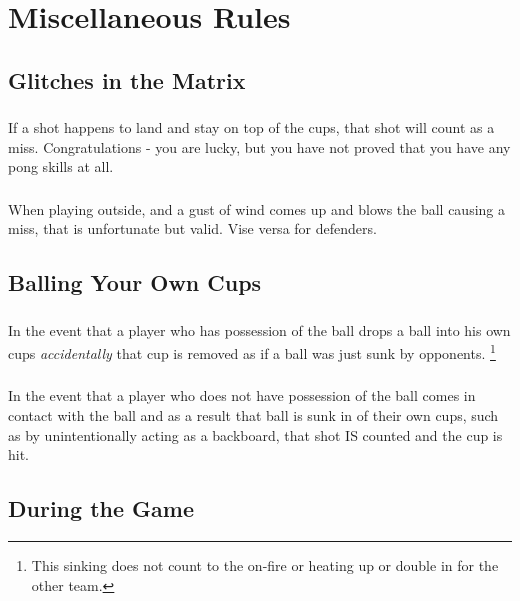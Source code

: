 \section{Miscellaneous Rules}\label{sec:Misc}

	\subsection{Glitches in the Matrix}\label{ssec:Glitches}
		\subsubsection{}\label{sec:Misc,onto}
			 If a shot happens to land and stay on top of the cups, that shot will count as a miss.
             Congratulations - you are lucky, but you have not proved that you have any pong skills at all.
        \subsubsection{}\label{sssec:Misc,wind}
            When playing outside, and a gust of wind comes up and blows the ball causing a miss, that is unfortunate but valid.
            Vise versa for defenders.

	\subsection{Balling Your Own Cups}\label{ssec:OwnScore}
		\subsubsection{}\label{sssec:OwnScore,penalty}
             In the event that a player who has possession of the ball drops a ball into his own cups \emph{accidentally} that cup is removed as if a ball was just sunk by opponents.
             \footnote{This sinking does not count to the on-fire or heating up or double in for the other team.}
		\subsubsection{}\label{sssec:OwnScore,backboard}
			 In the event that a player who does not have possession of the ball comes in contact with the ball and as a result that ball is sunk in of their own cups, such as by unintentionally acting as a backboard, that shot IS counted and the cup is hit.
			 
	\subsection{During the Game}\label{ssec:DuringGame}
